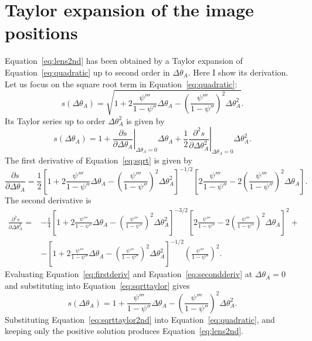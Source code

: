 \documentclass[usenatbib]{mnras}
\def\psiii{\psi''}
\def\psiiii{\psi'''}
\def\Eref#1{Equation~\ref{#1}\xspace}
\begin{document}
\section{Taylor expansion of the image positions}\label{sect:appendixa}
\Eref{eq:lens2nd} has been obtained by a Taylor expansion of \Eref{eq:quadratic} up to second order in $\Delta\theta_A$. Here I show its derivation. Let us focus on the square root term in \Eref{eq:quadratic}:
\begin{equation}\label{eq:sqrt}
s(\Delta\theta_A) = \sqrt{1 + 2\frac{\psiiii}{1-\psiii}\Delta\theta_A - \left(\frac{\psiiii}{1-\psiii}\right)^2\Delta\theta_A^2}.
\end{equation}
Its Taylor series up to order $\Delta\theta_A^2$ is given by
\begin{equation}\label{eq:sqrttaylor}
s(\Delta\theta_A) = 1 + \left. \frac{\partial s}{\partial \Delta\theta_A} \right\rvert_{\Delta\theta_A=0}\Delta\theta_A + \frac12\left.\frac{\partial^2 s}{\partial \Delta\theta_A^2}\right\rvert_{\Delta\theta_A=0}\Delta\theta_A^2.
\end{equation}
The first derivative of \Eref{eq:sqrt} is given by
\begin{equation}\label{eq:firstderiv}
\frac{\partial s}{\partial \Delta\theta_A} = \frac12\left[1 + 2\frac{\psiiii}{1-\psiii}\Delta\theta_A - \left(\frac{\psiiii}{1-\psiii}\right)^2\Delta\theta_A^2\right]^{-1/2}\left[2\frac{\psiiii}{1-\psiii}- 2\left(\frac{\psiiii}{1-\psiii}\right)^2\Delta\theta_A\right].
\end{equation}
The second derivative is
\begin{align}\label{eq:secondderiv}
\frac{\partial^2 s}{\partial \Delta\theta_A^2} = & -\frac14\left[1 + 2\frac{\psiiii}{1-\psiii}\Delta\theta_A - \left(\frac{\psiiii}{1-\psiii}\right)^2\Delta\theta_A^2\right]^{-3/2}\left[2\frac{\psiiii}{1-\psiii}- 2\left(\frac{\psiiii}{1-\psiii}\right)^2\Delta\theta_A\right]^2 + \nonumber \\ 
& - \left[1 + 2\frac{\psiiii}{1-\psiii}\Delta\theta_A - \left(\frac{\psiiii}{1-\psiii}\right)^2\Delta\theta_A^2\right]^{-1/2}\left(\frac{\psiiii}{1-\psiii}\right)^2.
\end{align}
Evaluating \Eref{eq:firstderiv} and \Eref{eq:secondderiv} at $\Delta\theta_A=0$ and substituting into \Eref{eq:sqrttaylor} gives
\begin{equation}\label{eq:sqrttaylor2nd}
s(\Delta\theta_A) = 1 + \frac{\psiiii}{1-\psiii}\Delta\theta_A - \left(\frac{\psiiii}{1-\psiii}\right)^2\Delta\theta_A^2.
\end{equation}
Substituting \Eref{eq:sqrttaylor2nd} into \Eref{eq:quadratic}, and keeping only the positive solution produces \Eref{eq:lens2nd}.
\end{document}
